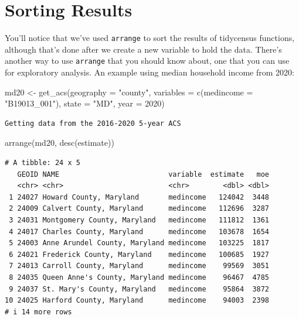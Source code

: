 \documentclass[
  letterpaper,
  DIV=11,
  numbers=noendperiod]{scrreprt}
\newenvironment{Shaded}{\begin{snugshade}}{\end{snugshade}}
\newcommand{\AttributeTok}[1]{\textcolor[rgb]{0.40,0.45,0.13}{#1}}
\newcommand{\DecValTok}[1]{\textcolor[rgb]{0.68,0.00,0.00}{#1}}
\newcommand{\FunctionTok}[1]{\textcolor[rgb]{0.28,0.35,0.67}{#1}}
\newcommand{\NormalTok}[1]{\textcolor[rgb]{0.00,0.23,0.31}{#1}}
\newcommand{\OtherTok}[1]{\textcolor[rgb]{0.00,0.23,0.31}{#1}}
\newcommand{\StringTok}[1]{\textcolor[rgb]{0.13,0.47,0.30}{#1}}
\begin{document}
\hypertarget{sorting-results}{%
\section{Sorting Results}\label{sorting-results}}

You'll notice that we've used \texttt{arrange} to sort the results of
tidycensus functions, although that's done after we create a new
variable to hold the data. There's another way to use \texttt{arrange}
that you should know about, one that you can use for exploratory
analysis. An example using median household income from 2020:

\begin{Shaded}
\begin{Highlighting}[]
\NormalTok{md20 }\OtherTok{\textless{}{-}} \FunctionTok{get\_acs}\NormalTok{(}\AttributeTok{geography =} \StringTok{"county"}\NormalTok{,}
              \AttributeTok{variables =} \FunctionTok{c}\NormalTok{(}\AttributeTok{medincome =} \StringTok{"B19013\_001"}\NormalTok{),}
              \AttributeTok{state =} \StringTok{"MD"}\NormalTok{,}
              \AttributeTok{year =} \DecValTok{2020}\NormalTok{)}
\end{Highlighting}
\end{Shaded}

\begin{verbatim}
Getting data from the 2016-2020 5-year ACS
\end{verbatim}

\begin{Shaded}
\begin{Highlighting}[]
\FunctionTok{arrange}\NormalTok{(md20, }\FunctionTok{desc}\NormalTok{(estimate))}
\end{Highlighting}
\end{Shaded}

\begin{verbatim}
# A tibble: 24 x 5
   GEOID NAME                          variable  estimate   moe
   <chr> <chr>                         <chr>        <dbl> <dbl>
 1 24027 Howard County, Maryland       medincome   124042  3448
 2 24009 Calvert County, Maryland      medincome   112696  3287
 3 24031 Montgomery County, Maryland   medincome   111812  1361
 4 24017 Charles County, Maryland      medincome   103678  1654
 5 24003 Anne Arundel County, Maryland medincome   103225  1817
 6 24021 Frederick County, Maryland    medincome   100685  1927
 7 24013 Carroll County, Maryland      medincome    99569  3051
 8 24035 Queen Anne's County, Maryland medincome    96467  4785
 9 24037 St. Mary's County, Maryland   medincome    95864  3872
10 24025 Harford County, Maryland      medincome    94003  2398
# i 14 more rows
\end{verbatim}
\end{document}
